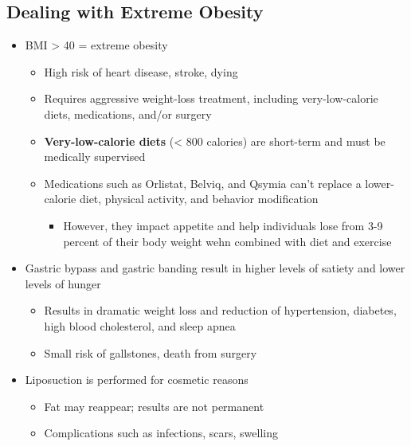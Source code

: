 \documentclass[12pt]{article}
\begin{document}
        \subsection{Dealing with Extreme Obesity}
            \begin{itemize}
                \item BMI > 40 = extreme obesity
                    \begin{itemize}
                        \item High risk of heart disease, stroke, dying
                        \item Requires aggressive weight-loss treatment, including very-low-calorie diets, medications, and/or surgery
                        \item \textbf{Very-low-calorie diets} (< 800 calories) are short-term and must be medically supervised
                        \item Medications such as Orlistat, Belviq, and Qsymia can't replace a lower-calorie diet, physical activity, and behavior modification
                            \begin{itemize}
                                \item However, they impact appetite and help individuals lose from 3-9 percent of their body weight wehn combined with diet and exercise
                            \end{itemize}
                    \end{itemize}
                \item Gastric bypass and gastric banding result in higher levels of satiety and lower levels of hunger
                    \begin{itemize}
                        \item Results in dramatic weight loss and reduction of hypertension, diabetes, high blood cholesterol, and sleep apnea
                        \item Small risk of gallstones, death from surgery
                    \end{itemize}
                \item Liposuction is performed for cosmetic reasons
                    \begin{itemize}
                        \item Fat may reappear; results are not permanent
                        \item Complications such as infections, scars, swelling
                    \end{itemize}
            \end{itemize}
\end{document}
